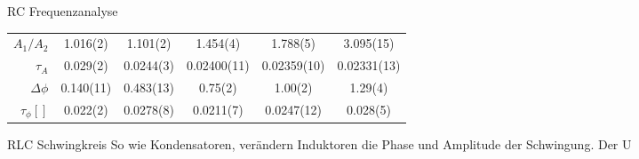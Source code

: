 \documentclass{alex_gp}
\begin{document}
\begin{mybox}{RC Frequenzanalyse}
	
	\begin{center}
		\begin{tabular}{@{\extracolsep{5mm}} 
				r
				S[table-format=1.4(2)]
				S[table-format=1.4(2)]
				S[table-format=1.4(2)]
				S[table-format=1.4(2)]
				S[table-format=1.4(2)]
			}
			\toprule
			\makecell[t]{}
			&   {}
			&   {}
			&   {}
			&   {}
			&   {} \\
			\midrule
			\( A_1/A_2 \) & 1.016(2) & 1.101(2) & 1.454(4) & 1.788(5) & 3.095(15) \\
			\( \tau_{A} \) & 0.029(2) & 0.0244(3) & 0.02400(11) & 0.02359(10) & 0.02331(13) \\
			\( \Delta\phi \) & 0.140(11) & 0.483(13) & 0.75(2) & 1.00(2) & 1.29(4) \\
			\( \tau_{\phi} []\) & 0.022(2) & 0.0278(8) & 0.0211(7) & 0.0247(12) & 0.028(5) \\
			\bottomrule
		\end{tabular}
		\label{table:1}
	\end{center}
\end{mybox}

\begin{mybox}{RLC Schwingkreis}
	So wie Kondensatoren, verändern Induktoren die Phase und Amplitude der Schwingung. Der U
\end{mybox}
\end{document}
